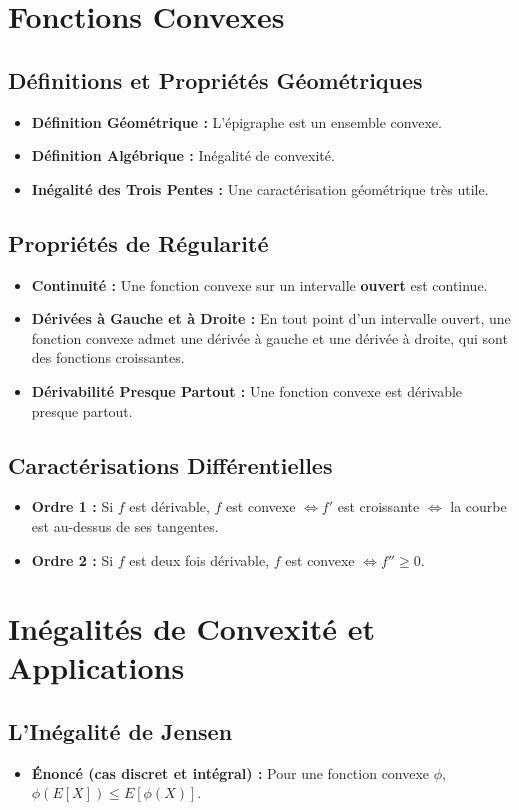 \documentclass[12pt, a4paper, parskip=full]{report}
\theoremstyle{agregstyle}
\begin{document}
\section{Fonctions Convexes}
\subsection{Définitions et Propriétés Géométriques}
\begin{itemize}
    \item \textbf{Définition Géométrique :} L'épigraphe est un ensemble convexe.
    \item \textbf{Définition Algébrique :} Inégalité de convexité.
    \item \textbf{Inégalité des Trois Pentes :} Une caractérisation géométrique très utile.
\end{itemize}
\subsection{Propriétés de Régularité}
\begin{itemize}
    \item \textbf{Continuité :} Une fonction convexe sur un intervalle \textbf{ouvert} est continue.
    \item \textbf{Dérivées à Gauche et à Droite :} En tout point d'un intervalle ouvert, une fonction convexe admet une dérivée à gauche et une dérivée à droite, qui sont des fonctions croissantes.
    \item \textbf{Dérivabilité Presque Partout :} Une fonction convexe est dérivable presque partout.
\end{itemize}
\subsection{Caractérisations Différentielles}
\begin{itemize}
    \item \textbf{Ordre 1 :} Si $f$ est dérivable, $f$ est convexe $\iff f'$ est croissante $\iff$ la courbe est au-dessus de ses tangentes.
    \item \textbf{Ordre 2 :} Si $f$ est deux fois dérivable, $f$ est convexe $\iff f'' \ge 0$.
\end{itemize}

\section{Inégalités de Convexité et Applications}
\subsection{L'Inégalité de Jensen}
\begin{itemize}
    \item \textbf{Énoncé (cas discret et intégral) :} Pour une fonction convexe $\phi$, $\phi(E[X]) \le E[\phi(X)]$.
\end{itemize}
\end{document}
